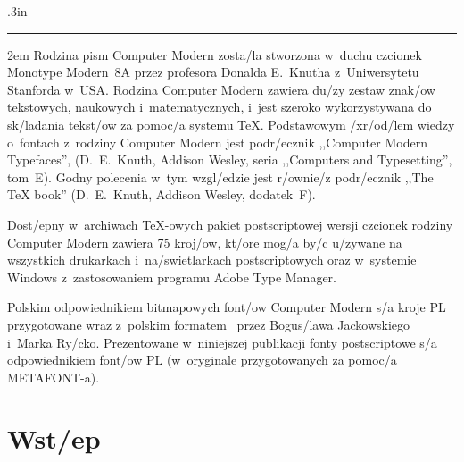 {\leftskip.3in\hrule height0pt \dunh \baselineskip 18pt \parindent2em
Rodzina pism Computer Modern zosta/la stworzona w~duchu czcionek Monotype
Modern~8A przez profesora Donalda E.~Knutha z~Uniwersytetu Stanforda w~USA.
Rodzina Computer Modern zawiera du/zy zestaw znak/ow tekstowych, naukowych
i~matematycznych, i~jest szeroko wykorzystywana do sk/ladania tekst/ow za
pomoc/a systemu \TeX. Podstawowym /xr/od/lem wiedzy o~fontach z~rodziny
Computer Modern jest podr/ecznik ,,Computer Modern Typefaces'',
(D.~E.~Knuth, Addison Wesley, seria ,,Computers and Typesetting'', tom~E).
Godny polecenia w~tym wzgl/edzie jest r/ownie/z podr/ecznik ,,The \TeX
book'' (D.~E.~Knuth, Addison Wesley, dodatek~F).

Dost/epny w~archiwach \TeX-owych pakiet postscriptowej wersji czcionek
rodziny Computer Modern zawiera 75 kroj/ow, kt/ore mog/a by/c u/zywane na
wszystkich drukarkach i~na/swietlarkach postscriptowych oraz w~systemie
Windows z~zastosowaniem programu Adobe Type Manager.

Polskim odpowiednikiem bitmapowych font/ow Computer Modern s/a kroje PL
przygotowane wraz z~polskim formatem \MeX\ przez Bogus/lawa Jackowskiego
i~Marka Ry/cko.  Prezentowane w~niniejszej publikacji fonty postscriptowe s/a
odpowiednikiem font/ow PL (w~oryginale przygotowanych za pomoc/a METAFONT-a).

}

\vfil\eject

\chapter{Wst/ep}

